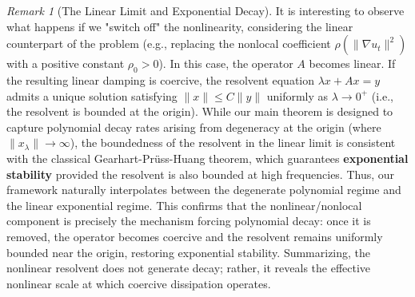 \documentclass[11pt,reqno]{amsart}
\theoremstyle{remark}
\newtheorem{remark}[theorem]{Remark}
\begin{document}
\begin{remark}[The Linear Limit and Exponential Decay]
It is interesting to observe what happens if we "switch off" the nonlinearity, considering the linear counterpart of the problem (e.g., replacing the nonlocal coefficient $\rho(\|\nabla u_t\|^2)$ with a positive constant $\rho_0 > 0$).
In this case, the operator $A$ becomes linear. If the resulting linear damping is coercive, the resolvent equation $\lambda x + Ax = y$ admits a unique solution satisfying $\|x\| \le C\|y\|$ uniformly as $\lambda \to 0^+$ (i.e., the resolvent is bounded at the origin).
While our main theorem is designed to capture polynomial decay rates arising from degeneracy at the origin (where $\|x_\lambda\| \to \infty$), the boundedness of the resolvent in the linear limit is consistent with the classical Gearhart-Prüss-Huang theorem, which guarantees \textbf{exponential stability} provided the resolvent is also bounded at high frequencies. Thus, our framework naturally interpolates between the degenerate polynomial regime and the linear exponential regime. This confirms that the nonlinear/nonlocal component is precisely the mechanism forcing polynomial decay: once it is removed, the operator becomes coercive and the resolvent remains uniformly bounded near the origin, restoring exponential stability. Summarizing, the nonlinear resolvent does not generate decay;
rather, it reveals the effective nonlinear scale at which
coercive dissipation operates.
\end{remark}


\end{document}
